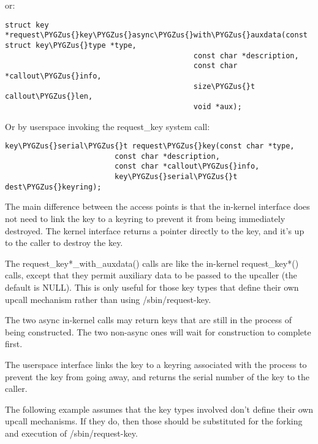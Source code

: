 \documentclass[a4paper,8pt,english]{sphinxmanual}
\def\PYGZus{\char`\_}
\begin{document}
or:

\begin{Verbatim}[commandchars=\\\{\}]
struct key *request\PYGZus{}key\PYGZus{}async\PYGZus{}with\PYGZus{}auxdata(const struct key\PYGZus{}type *type,
                                           const char *description,
                                           const char *callout\PYGZus{}info,
                                           size\PYGZus{}t callout\PYGZus{}len,
                                           void *aux);
\end{Verbatim}

Or by userspace invoking the request\_key system call:

\begin{Verbatim}[commandchars=\\\{\}]
key\PYGZus{}serial\PYGZus{}t request\PYGZus{}key(const char *type,
                         const char *description,
                         const char *callout\PYGZus{}info,
                         key\PYGZus{}serial\PYGZus{}t dest\PYGZus{}keyring);
\end{Verbatim}

The main difference between the access points is that the in-kernel interface
does not need to link the key to a keyring to prevent it from being immediately
destroyed.  The kernel interface returns a pointer directly to the key, and
it's up to the caller to destroy the key.

The request\_key*\_with\_auxdata() calls are like the in-kernel request\_key*()
calls, except that they permit auxiliary data to be passed to the upcaller (the
default is NULL).  This is only useful for those key types that define their
own upcall mechanism rather than using /sbin/request-key.

The two async in-kernel calls may return keys that are still in the process of
being constructed.  The two non-async ones will wait for construction to
complete first.

The userspace interface links the key to a keyring associated with the process
to prevent the key from going away, and returns the serial number of the key to
the caller.

The following example assumes that the key types involved don't define their
own upcall mechanisms.  If they do, then those should be substituted for the
forking and execution of /sbin/request-key.
\end{document}
